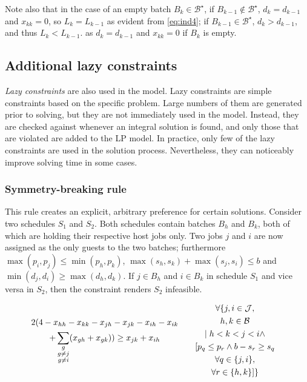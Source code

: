 \documentclass[oribibl]{llncs}
\begin{document}
Note also that in the case of an empty batch $B_k \in
\mathcal{B}^\star$, if $B_{k-1} \notin \mathcal{B}^\star$,
$d_k = d_{k-1}$ and $x_{kk}=0$, so $L_k = L_{k-1}$ as evident from
\eqref{eq:ind4}; if $B_{k-1} \in \mathcal{B}^\star$, $d_k > d_{k-1}$,
and thus $L_k < L_{k-1}$. as $d_k = d_{k-1}$ and $x_{kk} = 0$ if $B_k$
is empty.

\subsection{Additional lazy constraints}
\label{sec:lazyconstraints}
\textit{Lazy constraints} \cite{cplexmanual} are also used in the model. Lazy
constraints are simple constraints based on the specific problem. Large numbers
of them are generated prior to solving, but they are
not immediately used in the model. Instead, they are checked against
whenever an integral solution is found, and only those that are violated
are added to the LP model. In practice, only few of the lazy constraints
are used in the solution process. Nevertheless, they can noticeably
improve solving time in some cases.

\subsubsection{Symmetry-breaking rule}
This rule creates an explicit, arbitrary preference for certain solutions.
Consider two schedules $S_1$ and
$S_2$. Both schedules contain batches $B_h$ and $B_k$, both of which
are holding their respective host jobs only. Two jobs $j$ and $i$ are now
assigned as the only guests to the two batches; furthermore $\max(p_i, p_j) \leq
\min(p_h, p_k)$, $\max(s_h, s_k) + \max(s_j, s_i) \leq b$ and
$\min(d_j, d_i) \geq \max(d_h, d_k)$. If $j \in
B_h$ and $i \in B_k$ in schedule $S_1$ and vice versa in
$S_2$, then the constraint renders $S_2$ infeasible.

\begin{alignat}{2}
  & \begin{gathered} 2 (  4 - x_{hh} - x_{kk} - x_{jh} - x_{jk} -
x_{ih} - x_{ik}\hfill \\+ \sum_{\substack{{g}\\{g \neq j}\\{g \neq
i}}} (x_{gh} + x_{gk}) ) \geq x_{jk} + x_{ih} \end{gathered}
\quad && \begin{gathered} \forall\{ j, i \in \mathcal{J}, \\ h, k \in
\mathcal{B} \\|\; h < k <
j < i \land \\ [p_q \leq p_r \land b - s_r \geq s_q\\ \forall q \in
\{j,i\}, \\ \forall r
\in \{h,k\}] \} \end{gathered}
\end{alignat}
\end{document}
